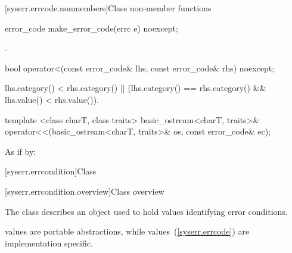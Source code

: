[syserr.errcode.nonmembers]{Class  non-member functions}

%
\begin{itemdecl}
error_code make_error_code(errc e) noexcept;
\end{itemdecl}

\begin{itemdescr}
\pnum
\returns {}.
\end{itemdescr}

%
\begin{itemdecl}
bool operator<(const error_code& lhs, const error_code& rhs) noexcept;
\end{itemdecl}

\begin{itemdescr}
\pnum
\returns
\begin{codeblock}
lhs.category() < rhs.category() ||
(lhs.category() == rhs.category() && lhs.value() < rhs.value()).
\end{codeblock}
\end{itemdescr}

%
\begin{itemdecl}
template <class charT, class traits>
  basic_ostream<charT, traits>&
    operator<<(basic_ostream<charT, traits>& os, const error_code& ec);
\end{itemdecl}

\begin{itemdescr}
\pnum
\effects
As if by: 
\end{itemdescr}


[syserr.errcondition]{Class }

[syserr.errcondition.overview]{Class  overview}

\pnum
The class  describes an object used to hold values identifying
error conditions. \begin{note}  values are portable abstractions,
while  values~(\ref{syserr.errcode}) are implementation specific. \end{note}

